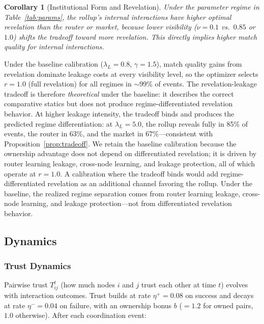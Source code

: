 \documentclass[12pt]{article}
\newtheorem{corollary}{Corollary}
\theoremstyle{definition}
\begin{document}
\begin{corollary}[Institutional Form and Revelation]
\label{cor:revelation}
Under the parameter regime in Table~\ref{tab:params}, the rollup's internal interactions have higher optimal revelation than the router or market, because lower visibility ($\nu = 0.1$ vs.\ $0.85$ or $1.0$) shifts the tradeoff toward more revelation. This directly implies higher match quality for internal interactions.
\end{corollary}

\begin{remark}
Under the baseline calibration ($\lambda_L = 0.8$, $\gamma = 1.5$), match quality gains from revelation dominate leakage costs at every visibility level, so the optimizer selects $r = 1.0$ (full revelation) for all regimes in $\sim$99\% of events. The revelation-leakage tradeoff is therefore \textit{theoretical} under the baseline: it describes the correct comparative statics but does not produce regime-differentiated revelation behavior. At higher leakage intensity, the tradeoff binds and produces the predicted regime differentiation: at $\lambda_L = 5.0$, the rollup reveals fully in 85\% of events, the router in 63\%, and the market in 67\%---consistent with Proposition~\ref{prop:tradeoff}. We retain the baseline calibration because the ownership advantage does not depend on differentiated revelation; it is driven by router learning leakage, cross-node learning, and leakage protection, all of which operate at $r = 1.0$. A calibration where the tradeoff binds would add regime-differentiated revelation as an additional channel favoring the rollup. Under the baseline, the realized regime separation comes from router learning leakage, cross-node learning, and leakage protection---not from differentiated revelation behavior.
\end{remark}

\subsection{Dynamics}

\subsubsection{Trust Dynamics}

Pairwise trust $T_{ij}^t$ (how much nodes $i$ and $j$ trust each other at time $t$) evolves with interaction outcomes. Trust builds at rate $\eta^+ = 0.08$ on success and decays at rate $\eta^- = 0.04$ on failure, with an ownership bonus $b$ ($= 1.2$ for owned pairs, $1.0$ otherwise). After each coordination event:
\end{document}
